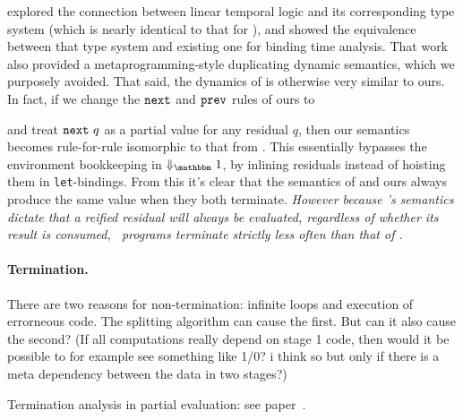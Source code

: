 \cite{davies96} explored the connection between linear temporal logic and its corresponding type system (which is nearly identical to that for \lang), 
and showed the equivalence between that type system and existing one for binding time analysis. 
That work also provided a metaprogramming-style duplicating dynamic semantics, which we purposely avoided.
That said, the dynamics of \cite{davies96} is otherwise very similar to ours.
In fact, if we change the ${\tt next}$ and ${\tt prev}$ rules of ours to 
and treat ${\tt next}~q$ as a partial value for any residual $q$,
then our semantics becomes rule-for-rule isomorphic to that from \cite{davies96}. This essentially bypasses the
environment bookkeeping in $\redonesym$, by inlining residuals instead of
hoisting them in \verb|let|-bindings.
From this it's clear that the semantics of \cite{davies96} and ours always produce the same value when they both terminate.
{\em However because \lang's semantics dictate that a reified residual will always be evaluated, regardless of whether its result is consumed, \lang\ programs terminate strictly less often than that of \cite{davies96}}.

\paragraph{Termination.}

There are two reasons for non-termination: infinite loops and
execution of errorneous code.  The splitting algorithm can cause the
first.  But can it also cause the second? (If all computations really
depend on stage 1 code, then would it be possible to for example see
something like 1/0?  i think so but only if there is a meta dependency
between the data in two stages?)

Termination analysis in partial evaluation: see paper~\cite{AH96,GJ05}.

